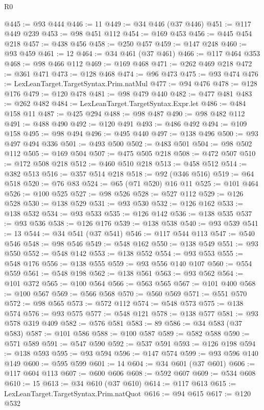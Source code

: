 \begin{lexlean}{R0}
\begin{coremodule}
@445 := @93 @444
@446 := 11
@449 := @34 @446 (@37 @446)
@451 := @117 @449 @239
@453 := @98 @451 @112
@454 := @169 @453
@456 := @445 @454 @218
@457 := @438 @456
@458 := @250 @457
@459 := @147 @248
@460 := @93 @459
@461 := 12
@464 := @34 @461 (@37 @461)
@466 := @117 @464 @353
@468 := @98 @466 @112
@469 := @169 @468
@471 := @262 @469 @218
@472 := @361 @471
@473 := @128 @468
@474 := @96 @473
@475 := @93 @474
@476 := LexLeanTarget.TargetSyntax.Prim.natMul
@477 := @94 @476
@478 := @128 @176
@479 := @120 @478
@481 := @98 @479 @440
@482 := @477 @481
@483 := @262 @482
@484 := LexLeanTarget.TargetSyntax.Expr.let
@486 := @484 @158 @11
@487 := @425 @294
@488 := @98 @487
@490 := @98 @482 @112
@491 := @488 @490
@492 := @120 @491
@493 := @486 @492
@494 := @109 @158
@495 := @98 @494
@496 := @495 @440
@497 := @138 @496
@500 := @93 @497 @494 @336
@501 := @493 @500
@502 := @483 @501
@504 := @98 @502 @112
@505 := @169 @504
@507 := @475 @505 @218
@508 := @472 @507
@510 := @172 @508 @218
@512 := @460 @510 @218
@513 := @458 @512
@514 := @382 @513
@516 := @357 @514 @218
@518 := @92 (@346 @516)
@519 := @64 @518
@520 := @76 @83
@524 := @65 (@71 @520) @16 @11
@525 := @101 @464
@526 := @100 @525
@527 := @98 @526
@528 := @527 @112
@529 := @126 @528
@530 := @138 @529
@531 := @93 @530
@532 := @126 @162
@533 := @138 @532
@534 := @93 @533
@535 := @126 @142
@536 := @138 @535
@537 := @93 @536
@538 := @126 @176
@539 := @138 @538
@540 := @93 @539
@541 := 13
@544 := @34 @541 (@37 @541)
@546 := @117 @544 @113
@547 := @540 @546
@548 := @98 @546
@549 := @548 @162
@550 := @138 @549
@551 := @93 @550
@552 := @548 @142
@553 := @138 @552
@554 := @93 @553
@555 := @548 @176
@556 := @138 @555
@559 := @93 @556 @140 @107
@560 := @554 @559
@561 := @548 @198
@562 := @138 @561
@563 := @93 @562
@564 := @101 @372
@565 := @100 @564
@566 := @563 @565
@567 := @101 @400
@568 := @100 @567
@569 := @566 @568
@570 := @560 @569
@571 := @551 @570
@572 := @98 @565
@573 := @572 @112
@574 := @548 @573
@575 := @138 @574
@576 := @93 @575
@577 := @548 @121
@578 := @138 @577
@581 := @93 @578 @319 @409
@582 := @576 @581
@583 := 89
@586 := @34 @583 (@37 @583)
@587 := @101 @586
@588 := @100 @587
@589 := @582 @588
@590 := @571 @589
@591 := @547 @590
@592 := @537 @591
@593 := @126 @198
@594 := @138 @593
@595 := @93 @594
@596 := @147 @574
@599 := @93 @596 @140 @149
@600 := @595 @599
@601 := 14
@604 := @34 @601 (@37 @601)
@606 := @117 @604 @113
@607 := @600 @606
@608 := @592 @607
@609 := @534 @608
@610 := 15
@613 := @34 @610 (@37 @610)
@614 := @117 @613
@615 := LexLeanTarget.TargetSyntax.Prim.natQuot
@616 := @94 @615
@617 := @120 @532

\end{coremodule}
\end{lexlean}
